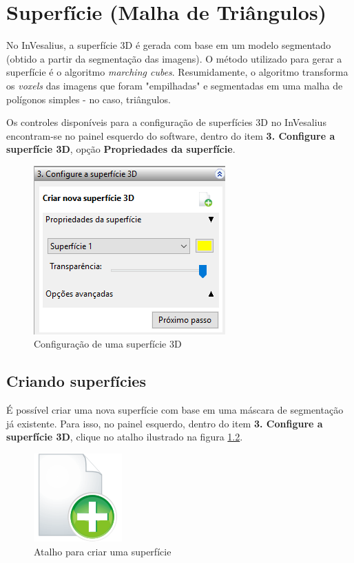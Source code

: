 \chapter{Superfície (Malha de Triângulos)}
\label{cap_surface}

No InVesalius, a superfície 3D é gerada com base em um modelo segmentado (obtido a partir
da segmentação das imagens). O método utilizado para gerar a superfície é o algoritmo 
\textit{marching cubes}. Resumidamente, o algoritmo transforma os \textit{voxels} das
imagens que foram "empilhadas" e segmentadas em uma malha de polígonos simples - no caso,
triângulos.

Os controles disponíveis para a configuração de superfícies 3D no InVesalius encontram-se
no painel esquerdo do software, dentro do item \textbf{3. Configure a superfície 3D}, opção
\textbf{Propriedades da superfície}.

\begin{figure}[!htb]
\centering
\includegraphics[scale=0.65]{../user_guide_figures/invesalius_screen/surface_config_panel_pt.png}
\caption{Configuração de uma superfície 3D}
\label{fig:3d_surface_managment}
\end{figure}


\section{Criando superfícies}

É possível criar uma nova superfície com base em uma máscara de segmentação já existente.
Para isso, no painel esquerdo, dentro do item \textbf{3. Configure a superfície 3D}, clique
no atalho ilustrado na figura \ref{fig:shortcut_new_surface}.

\begin{figure}[!htb]
\centering
\includegraphics[scale=0.18]{../user_guide_figures/icons/object_add_original.png}
\caption{Atalho para criar uma superfície}
\label{fig:shortcut_new_surface}
\end{figure}

